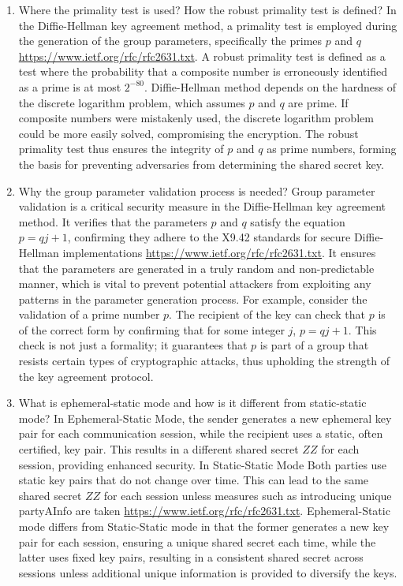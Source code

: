 \documentclass{article}
\begin{document}
\begin{enumerate}
    \item Where the primality test is used? How the robust primality test is defined?
    In the Diffie-Hellman key agreement method, a primality test is employed during the generation of the group parameters, specifically the primes \( p \) and \( q \) \url{https://www.ietf.org/rfc/rfc2631.txt}.
    A robust primality test is defined as a test where the probability that a composite number is erroneously identified as a prime is at most \( 2^{-80} \).
    Diffie-Hellman method depends on the hardness of the discrete logarithm problem, which assumes \( p \) and \( q \) are prime.
    If composite numbers were mistakenly used, the discrete logarithm problem could be more easily solved, compromising the encryption.
    The robust primality test thus ensures the integrity of \( p \) and \( q \) as prime numbers, forming the basis for preventing adversaries from determining the shared secret key.

    \item Why the group parameter validation process is needed?
    Group parameter validation is a critical security measure in the Diffie-Hellman key agreement method.
    It verifies that the parameters \( p \) and \( q \) satisfy the equation \( p = qj + 1 \), confirming they adhere to the X9.42 standards for secure Diffie-Hellman implementations \url{https://www.ietf.org/rfc/rfc2631.txt}.
    It ensures that the parameters are generated in a truly random and non-predictable manner, which is vital to prevent potential attackers from exploiting any patterns in the parameter generation process.
    For example, consider the validation of a prime number \( p \).
    The recipient of the key can check that \( p \) is of the correct form by confirming that for some integer \( j \), \( p = qj + 1 \).
    This check is not just a formality; it guarantees that \( p \) is part of a group that resists certain types of cryptographic attacks, thus upholding the strength of the key agreement protocol.

    \item What is ephemeral-static mode and how is it different from static-static mode?
    In Ephemeral-Static Mode, the sender generates a new ephemeral key pair for each communication session, while the recipient uses a static, often certified, key pair.
    This results in a different shared secret \( ZZ \) for each session, providing enhanced security.
    In Static-Static Mode Both parties use static key pairs that do not change over time.
    This can lead to the same shared secret \( ZZ \) for each session unless measures such as introducing unique partyAInfo are taken \url{https://www.ietf.org/rfc/rfc2631.txt}.
    Ephemeral-Static mode differs from Static-Static mode in that the former generates a new key pair for each session, ensuring a unique shared secret each time, while the latter uses fixed key pairs, resulting in a consistent shared secret across sessions unless additional unique information is provided to diversify the keys.

\end{enumerate}
\end{document}

